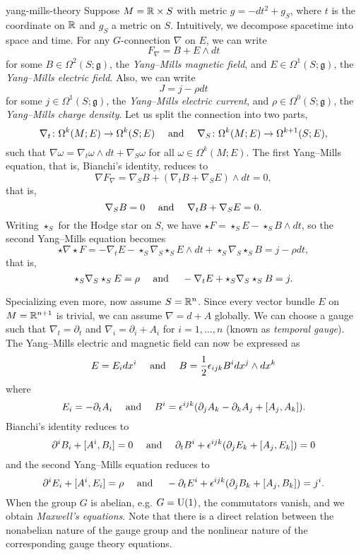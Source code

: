 \begin{example}{yang-mills-theory}
    Suppose $M = \mathbb{R} \times S$ with metric $g = -dt^2 + g_S$, where $t$ is the coordinate on $\mathbb{R}$ and $g_S$ a metric on $S$. Intuitively, we decompose spacetime into space and time. For any $G$-connection $\nabla$ on $E$, we can write
    \[ F_\nabla = B + E \wedge dt \]
    for some $B \in \Omega^2(S; \mathfrak{g})$, the \textit{Yang--Mills magnetic field}, and $E \in \Omega^1(S; \mathfrak{g})$, the \textit{Yang--Mills electric field}. Also, we can write
    \[ J = j - \rho dt \]
    for some $j \in \Omega^1(S; \mathfrak{g})$, the \textit{Yang--Mills electric current}, and $\rho \in \Omega^0(S; \mathfrak{g})$, the \textit{Yang--Mills charge density}. Let us split the connection into two parts,
    \[ \nabla_t \colon \Omega^k(M; E) \to \Omega^k(S; E) \quad \textup{ and } \quad \nabla_S \colon \Omega^k(M; E) \to \Omega^{k + 1}(S; E) , \]
    such that $\nabla \omega = \nabla_t \omega \wedge dt + \nabla_S \omega$ for all $\omega \in \Omega^k(M; E)$. The first Yang--Mills equation, that is, Bianchi's identity, reduces to
    \[ \nabla F_\nabla = \nabla_S B + (\nabla_t B + \nabla_S E) \wedge dt = 0, \]
    that is,
    \[ \nabla_S B = 0 \quad \textup{ and } \quad \nabla_t B + \nabla_S E = 0 . \]
    Writing $\star_S$ for the Hodge star on $S$, we have $\star F = \star_S E - \star_S B \wedge dt$, so the second Yang--Mills equation becomes
    \[ \star \nabla \star F = - \nabla_t E - \star_S \nabla_S \star_S E \wedge dt + \star_S \nabla_S \star_S B = j - \rho dt , \]
    that is,
    \[ \star_S \nabla_S \star_S E = \rho \quad \textup{ and } \quad - \nabla_t E + \star_S \nabla_S \star_S B = j . \]
    
    Specializing even more, now assume $S = \mathbb{R}^n$. Since every vector bundle $E$ on $M = \mathbb{R}^{n + 1}$ is trivial, we can assume $\nabla = d + A$ globally. We can choose a gauge such that $\nabla_t = \partial_t$ and $\nabla_i = \partial_i + A_i$ for $i = 1, \ldots, n$ (known as \textit{temporal gauge}). The Yang--Mills electric and magnetic field can now be expressed as
    \[ E = E_i dx^i \quad \textup{ and } \quad B = \frac{1}{2} \epsilon_{ijk} B^i dx^j \wedge dx^k \]
    where
    \[ E_i = - \partial_t A_i \quad \textup{ and } \quad B^i = \epsilon^{ijk} ( \partial_j A_k - \partial_k A_j + [A_j, A_k] ) . \]
    Bianchi's identity reduces to
    \[ \partial^i B_i + [A^i, B_i] = 0 \quad \textup{ and } \quad \partial_t B^i + \epsilon^{ijk} (\partial_j E_k + [A_j, E_k]) = 0 \]
    and the second Yang--Mills equation reduces to
    \[ \partial^i E_i + [A^i, E_i] = \rho \quad \textup{ and } \quad - \partial_t E^i + \epsilon^{ijk} (\partial_j B_k + [A_j, B_k]) = j^i . \]
    When the group $G$ is abelian, e.g. $G = \textup{U}(1)$, the commutators vanish, and we obtain \textit{Maxwell's equations}. Note that there is a direct relation between the nonabelian nature of the gauge group and the nonlinear nature of the corresponding gauge theory equations.
\end{example}

